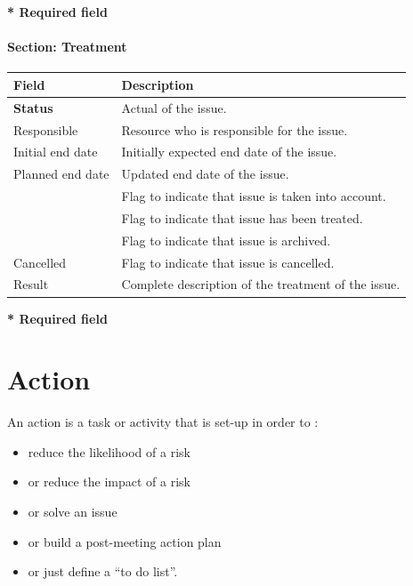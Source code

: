 \documentclass[letterpaper,10pt,english]{sphinxmanual}
\begin{document}
\textbf{* Required field}
\paragraph{Section: Treatment}

\begin{tabulary}{\linewidth}{|l|l|}
\hline
\textsf{\relax 
Field
} & \textsf{\relax 
Description
}\\
\hline
\textbf{Status}
 & 
Actual {\hyperref[Glossary:term-status]{\emph{}}} of the issue.
\\
\hline
Responsible
 & 
Resource who is responsible for the issue.
\\
\hline
Initial end date
 & 
Initially expected end date of the issue.
\\
\hline
Planned end date
 & 
Updated end date of the issue.
\\
\hline
{\hyperref[Glossary:term-handled]{\emph{}}}
 & 
Flag to indicate that issue is taken into account.
\\
\hline
{\hyperref[Glossary:term-done]{\emph{}}}
 & 
Flag to indicate that issue has been treated.
\\
\hline
{\hyperref[Glossary:term-closed]{\emph{}}}
 & 
Flag to indicate that issue is archived.
\\
\hline
Cancelled
 & 
Flag to indicate that issue is cancelled.
\\
\hline
Result
 & 
Complete description of the treatment of the issue.
\\
\hline\end{tabulary}


\textbf{* Required field}
\newpage
{}

\section{Action}
\label{RiskIssueManagement:action}\label{RiskIssueManagement:index-3}
An action is a task or activity that is set-up in order to :
\begin{itemize}
\item {} 
reduce the likelihood of a risk

\item {} 
or reduce the impact of a risk

\item {} 
or solve an issue

\item {} 
or build a post-meeting action plan

\item {} 
or just define a “to do list”.

\end{itemize}
\end{document}
